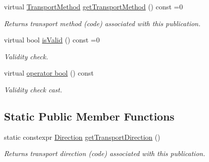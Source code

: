 \begin{DoxyCompactItemize}
\mbox{\label{classflow__ros_1_1routing_1_1_publication_wrapper_a0398202c79a6bdb1ff57acc8c730bc65}} 
virtual \hyperlink{transport__info_8h_ae57afcf849a5bdb82b958347c6ccc57b}{Transport\+Method} \hyperlink{classflow__ros_1_1routing_1_1_publication_wrapper_a0398202c79a6bdb1ff57acc8c730bc65}{get\+Transport\+Method} () const =0
\begin{DoxyCompactList}\small\item\em Returns transport method (code) associated with this publication. \end{DoxyCompactList}\item 
\mbox{\label{classflow__ros_1_1routing_1_1_publication_wrapper_afc33bf27092f8e8188e3f7955a6b7c97}} 
virtual bool \hyperlink{classflow__ros_1_1routing_1_1_publication_wrapper_afc33bf27092f8e8188e3f7955a6b7c97}{is\+Valid} () const =0
\begin{DoxyCompactList}\small\item\em Validity check. \end{DoxyCompactList}\item 
\mbox{\label{classflow__ros_1_1routing_1_1_publication_wrapper_ae3d53f17565deb8a0d5b6d971d11e813}} 
virtual \hyperlink{classflow__ros_1_1routing_1_1_publication_wrapper_ae3d53f17565deb8a0d5b6d971d11e813}{operator bool} () const
\begin{DoxyCompactList}\small\item\em Validity check cast. \end{DoxyCompactList}\end{DoxyCompactItemize}
\subsection*{Static Public Member Functions}
\begin{DoxyCompactItemize}
\item 
\mbox{\label{classflow__ros_1_1routing_1_1_publication_wrapper_a5ee03549ef54a9e5cc78d185ad866ec1}} 
static constexpr \hyperlink{transport__info_8h_acb4b6ac875de32a0d0ee8cec235f7752}{Direction} \hyperlink{classflow__ros_1_1routing_1_1_publication_wrapper_a5ee03549ef54a9e5cc78d185ad866ec1}{get\+Transport\+Direction} ()
\begin{DoxyCompactList}\small\item\em Returns transport direction (code) associated with this publication. \end{DoxyCompactList}\end{DoxyCompactItemize}


